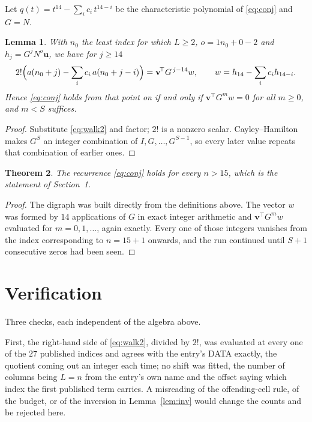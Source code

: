 \documentclass[11pt,a4paper]{article}
\theoremstyle{plain}
\newtheorem{theorem}{Theorem}
\newtheorem{lemma}[theorem]{Lemma}
\theoremstyle{definition}
\begin{document}
Let $q(t)=t^{14}-\sum_i c_i\,t^{14-i}$ be the characteristic polynomial of
\eqref{eq:conj} and $G=N$.

\begin{lemma}\label{lem:crit}
With $n_0$ the least index for which $L\ge2$, $o=1n_0+0-2$ and
$h_j=G^{j}N^{o}\mathbf{u}$, we have for $j\ge14$
\[
2!\Bigl(a(n_0+j)-\sum_i c_i\,a(n_0+j-i)\Bigr)=\mathbf{v}^{\!\top}G^{\,j-14}w,
\qquad w=h_{14}-\sum_i c_i h_{14-i} .
\]
Hence \eqref{eq:conj} holds from that point on if and only if
$\mathbf{v}^{\!\top}G^{m}w=0$ for all $m\ge0$, and $m<S$ suffices.
\end{lemma}

\begin{proof}
Substitute \eqref{eq:walk2} and factor; $2!$ is a nonzero scalar. Cayley--Hamilton
makes $G^{S}$ an integer combination of $I,G,\dots,G^{S-1}$, so every later value repeats
that combination of earlier ones.
\end{proof}

\begin{theorem}
The recurrence \eqref{eq:conj} holds for every $n>15$, which is the statement of
Section~1.
\end{theorem}

\begin{proof}
The digraph was built directly from the definitions above. The vector $w$ was formed by
$14$ applications of $G$ in exact integer arithmetic and $\mathbf{v}^{\!\top}G^{m}w$
evaluated for $m=0,1,\dots$, again exactly. Every one of those integers vanishes from the
index corresponding to $n=15+1$ onwards, and the run continued until $S+1$ consecutive
zeros had been seen.
\end{proof}

\section{Verification}

Three checks, each independent of the algebra above.

First, the right-hand side of \eqref{eq:walk2}, divided by $2!$, was evaluated at every
one of the $27$ published indices and agrees with the entry's DATA exactly, the quotient
coming out an integer each time; no shift was fitted, the number of columns being
$L=n$ from the entry's own name and the offset saying which index the first published
term carries. A misreading of the offending-cell rule, of the budget, or of the inversion in
Lemma~\ref{lem:inv} would change the counts and be rejected here.
\end{document}
